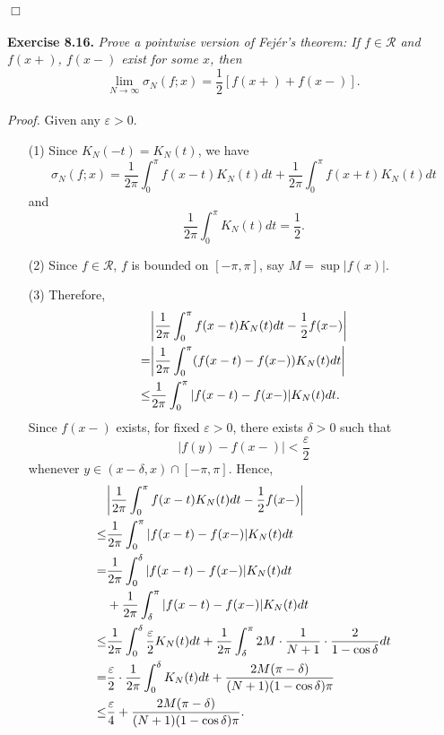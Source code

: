 \documentclass{article}
\begin{document}
$\Box$ \\\\






\textbf{Exercise 8.16.}
\emph{Prove a pointwise version of Fej\'er's theorem:
If $f \in \mathscr{R}$ and $f(x+)$, $f(x-)$ exist for some $x$, then
\[
  \lim_{N \to \infty} \sigma_N(f;x) = \frac{1}{2}[f(x+)+f(x-)].
\]
} \\

\emph{Proof.}
Given any $\varepsilon > 0$.
\begin{enumerate}
\item[(1)]
Since $K_N(-t) = K_N(t)$, we have
\[
  \sigma_N(f;x)
  = \frac{1}{2\pi} \int_{0}^{\pi} f(x-t)K_N(t)dt
    + \frac{1}{2\pi} \int_{0}^{\pi} f(x+t)K_N(t)dt
\]
and
\[
  \frac{1}{2\pi} \int_{0}^{\pi} K_N(t)dt = \frac{1}{2}.
\]

\item[(2)]
Since $f \in \mathscr{R}$,
$f$ is bounded on $[-\pi,\pi]$, say $M = \sup|f(x)|$.

\item[(3)]
Therefore,
  \begin{align*}
    &\abs{ \frac{1}{2\pi} \int_{0}^{\pi} f(x-t)K_N(t)dt - \frac{1}{2} f(x-) } \\
    =& \abs{ \frac{1}{2\pi} \int_{0}^{\pi} (f(x-t)-f(x-))K_N(t)dt } \\
    \leq& \frac{1}{2\pi} \int_{0}^{\pi} |f(x-t)-f(x-)|K_N(t)dt.
  \end{align*}
Since $f(x-)$ exists,
for fixed $\varepsilon > 0$, there exists $\delta > 0$
such that
\[
  |f(y) - f(x-)| < \frac{\varepsilon}{2}
\]
whenever $y \in (x-\delta,x) \cap [-\pi,\pi]$.
Hence,
  \begin{align*}
    &\abs{ \frac{1}{2\pi} \int_{0}^{\pi} f(x-t)K_N(t)dt - \frac{1}{2} f(x-) } \\
    \leq& \frac{1}{2\pi} \int_{0}^{\pi} |f(x-t)-f(x-)|K_N(t)dt \\
    =& \frac{1}{2\pi} \int_{0}^{\delta} |f(x-t)-f(x-)|K_N(t)dt \\
      &+ \frac{1}{2\pi} \int_{\delta}^{\pi} |f(x-t)-f(x-)|K_N(t)dt \\
    \leq& \frac{1}{2\pi} \int_{0}^{\delta} \frac{\varepsilon}{2} K_N(t)dt
      + \frac{1}{2\pi} \int_{\delta}^{\pi} 2M \cdot \frac{1}{N+1} \cdot \frac{2}{1-\cos \delta} dt \\
    =& \frac{\varepsilon}{2} \cdot \frac{1}{2\pi} \int_{0}^{\delta} K_N(t)dt
      + \frac{2M(\pi-\delta)}{(N+1)(1-\cos \delta)\pi} \\
    \leq& \frac{\varepsilon}{4} + \frac{2M(\pi-\delta)}{(N+1)(1-\cos \delta)\pi}. \\
  \end{align*}


\end{enumerate}
\end{document}
